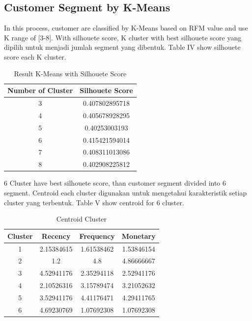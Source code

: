\documentclass[conference]{IEEEtran}
\begin{document}
\subsection{Customer Segment by K-Means}
In this process, customer are classified by K-Means based on RFM value and use K range of [3-8]. With silhouete score, K cluster with best silhouete score yang dipilih untuk menjadi jumlah segment yang dibentuk. Table IV show silhouete score each K cluster.

\begin{table}[h]
\renewcommand{\arraystretch}{1.3}
\caption{Result K-Means with Silhouete Score}
\label{tab:result_k-means}
\centering
\begin{tabular}{c|c}
    \hline
    Number of Cluster & Silhouete Score\\
    \hline
    3 & 0.407802895718\\
    \hline
    4 & 0.405678928295\\
    \hline
    5 & 0.40253003193\\
    \hline
    6 & 0.415421594014\\
    \hline
    7 & 0.408311013086\\
    \hline
    8 & 0.402908225812\\
    \hline
\end{tabular}
\end{table}

6 Cluster have best silhouete score, than customer segment divided into 6 segment. Centroid each cluster digunakan untuk mengetahui karakteristik setiap cluster yang terbentuk. Table V show centroid for 6 cluster. 

\begin{table}[h]
\renewcommand{\arraystretch}{1.3}
\caption{Centroid Cluster}
\label{tab:centroid_cluster}
\centering
\begin{tabular}{c|c|c|c}
    \hline
    Cluster & Recency & Frequency & Monetary\\
    \hline
    1 & 2.15384615 & 1.61538462 & 1.53846154\\
    \hline
    2 & 1.2 & 4.8 & 4.86666667\\
    \hline
    3 & 4.52941176 & 2.35294118 & 2.52941176\\
    \hline
    4 & 2.10526316 & 3.15789474 & 3.21052632\\
    \hline
    5 & 3.52941176 & 4.41176471 & 4.29411765\\
    \hline
    6 & 4.69230769 & 1.07692308 & 1.07692308\\
    \hline
\end{tabular}
\end{table}
\end{document}
